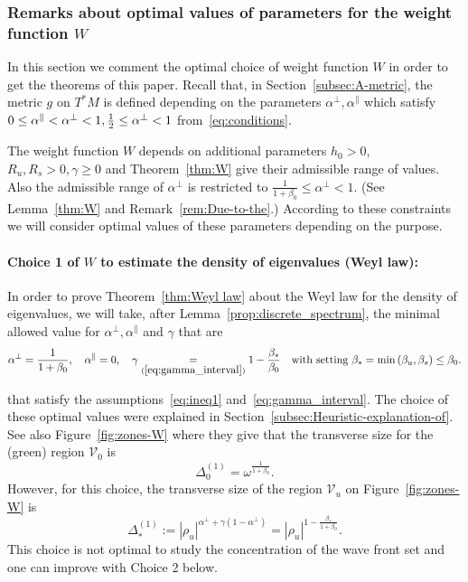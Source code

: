 \documentclass[AHL,Unicode,longabstracts,published]{cedram}
\newcommand*\eq[1]{\underset{(#1)}{=}}
\newcommand{\clV}{\mathcal{V}}
\begin{document}
\subsubsection{Remarks about optimal values of parameters for the weight function \texorpdfstring{$W$}{W}}\label{subsec:Optimal-values-of}

In this section we comment the optimal choice of weight function $W$ in order to get the theorems of this paper. Recall that, in Section~\ref{subsec:A-metric}, the metric $g$ on $T^{*}M$ is defined depending on the parameters $\alpha^{\perp},\alpha^{\parallel}$ which satisfy $0\leq\alpha^{\parallel}<\alpha^{\perp}<1,\frac{1}{2}\linebreak\leq\alpha^{\perp}<1$ from~\eqref{eq:conditions}.

The weight function $W$ depends on additional parameters $h_{0}>0$, $R_{u},R_{s}>0,\gamma\geq0$ and Theorem~\ref{thm:W} give their admissible range of values. Also the admissible range of $\alpha^{\perp}$ is restricted to $\frac{1}{1+\beta_{0}}\leq\alpha^{\perp}<1$. (See Lemma~\ref{thm:W} and Remark~\ref{rem:Due-to-the}.) According to these constraints we will consider optimal values of these parameters depending on the purpose.

\paragraph{Choice 1 of $W$ to estimate the density of eigenvalues (Weyl law):}

In order to prove Theorem~\ref{thm:Weyl law} about the Weyl law for the density of eigenvalues, we will take, after Lemma~\ref{prop:discrete_spectrum}, the minimal allowed value for $\alpha^{\perp},\alpha^{\parallel}$ and $\gamma$ that are
\[
\alpha^{\perp}=\frac{1}{1+\beta_{0}},\quad\alpha^{\parallel}=0,\quad\gamma\eq{\ref{eq:gamma_interval}}1-\frac{\beta_{*}}{\beta_{0}}\quad\text{with setting }\beta_{*}=\min\left(\beta_{u},\beta_{s}\right)\le\beta_{0}.
\]

\pagebreak

\noindent that satisfy the assumptions~\eqref{eq:ineq1} and~\eqref{eq:gamma_interval}. The choice of these optimal values were explained in Section~\ref{subsec:Heuristic-explanation-of}. See also Figure~\ref{fig:zones-W} where they give that the transverse size for the (green) region $\clV_{0}$ is
\[
\Delta_{0}^{\left(1\right)}=\omega^{\frac{1}{1+\beta_{0}}}.
\]
However, for this choice, the transverse size of the region $\clV_{u}$ on Figure~\ref{fig:zones-W} is
\begin{equation}\label{eq:Delta_1*}
\Delta_{*}^{\left(1\right)}:=\left|\rho_{u}\right|^{\alpha^{\perp}+\gamma\left(1-\alpha^{\perp}\right)}=\left|\rho_{u}\right|^{1-\frac{\beta_{*}}{1+\beta_{0}}}.
\end{equation}
This choice is not optimal to study the concentration of the wave front set and one can improve with Choice 2 below.
\end{document}
